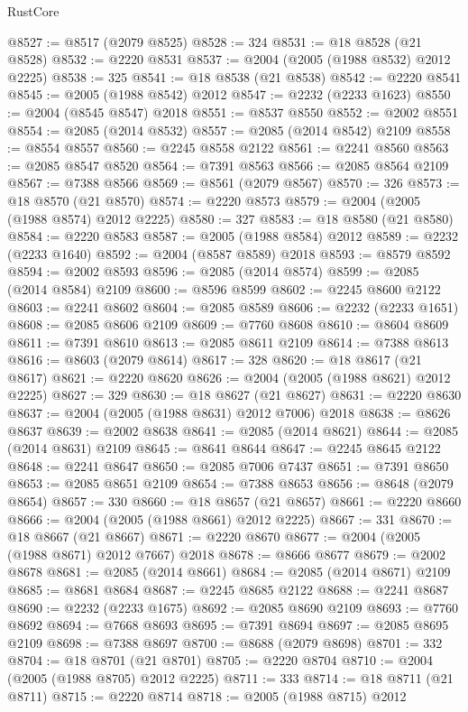 \begin{lexlean}{RustCore}
\begin{coremodule}
@8527 := @8517 (@2079 @8525)
@8528 := 324
@8531 := @18 @8528 (@21 @8528)
@8532 := @2220 @8531
@8537 := @2004 (@2005 (@1988 @8532) @2012 @2225)
@8538 := 325
@8541 := @18 @8538 (@21 @8538)
@8542 := @2220 @8541
@8545 := @2005 (@1988 @8542) @2012
@8547 := @2232 (@2233 @1623)
@8550 := @2004 (@8545 @8547) @2018
@8551 := @8537 @8550
@8552 := @2002 @8551
@8554 := @2085 (@2014 @8532)
@8557 := @2085 (@2014 @8542) @2109
@8558 := @8554 @8557
@8560 := @2245 @8558 @2122
@8561 := @2241 @8560
@8563 := @2085 @8547 @8520
@8564 := @7391 @8563
@8566 := @2085 @8564 @2109
@8567 := @7388 @8566
@8569 := @8561 (@2079 @8567)
@8570 := 326
@8573 := @18 @8570 (@21 @8570)
@8574 := @2220 @8573
@8579 := @2004 (@2005 (@1988 @8574) @2012 @2225)
@8580 := 327
@8583 := @18 @8580 (@21 @8580)
@8584 := @2220 @8583
@8587 := @2005 (@1988 @8584) @2012
@8589 := @2232 (@2233 @1640)
@8592 := @2004 (@8587 @8589) @2018
@8593 := @8579 @8592
@8594 := @2002 @8593
@8596 := @2085 (@2014 @8574)
@8599 := @2085 (@2014 @8584) @2109
@8600 := @8596 @8599
@8602 := @2245 @8600 @2122
@8603 := @2241 @8602
@8604 := @2085 @8589
@8606 := @2232 (@2233 @1651)
@8608 := @2085 @8606 @2109
@8609 := @7760 @8608
@8610 := @8604 @8609
@8611 := @7391 @8610
@8613 := @2085 @8611 @2109
@8614 := @7388 @8613
@8616 := @8603 (@2079 @8614)
@8617 := 328
@8620 := @18 @8617 (@21 @8617)
@8621 := @2220 @8620
@8626 := @2004 (@2005 (@1988 @8621) @2012 @2225)
@8627 := 329
@8630 := @18 @8627 (@21 @8627)
@8631 := @2220 @8630
@8637 := @2004 (@2005 (@1988 @8631) @2012 @7006) @2018
@8638 := @8626 @8637
@8639 := @2002 @8638
@8641 := @2085 (@2014 @8621)
@8644 := @2085 (@2014 @8631) @2109
@8645 := @8641 @8644
@8647 := @2245 @8645 @2122
@8648 := @2241 @8647
@8650 := @2085 @7006 @7437
@8651 := @7391 @8650
@8653 := @2085 @8651 @2109
@8654 := @7388 @8653
@8656 := @8648 (@2079 @8654)
@8657 := 330
@8660 := @18 @8657 (@21 @8657)
@8661 := @2220 @8660
@8666 := @2004 (@2005 (@1988 @8661) @2012 @2225)
@8667 := 331
@8670 := @18 @8667 (@21 @8667)
@8671 := @2220 @8670
@8677 := @2004 (@2005 (@1988 @8671) @2012 @7667) @2018
@8678 := @8666 @8677
@8679 := @2002 @8678
@8681 := @2085 (@2014 @8661)
@8684 := @2085 (@2014 @8671) @2109
@8685 := @8681 @8684
@8687 := @2245 @8685 @2122
@8688 := @2241 @8687
@8690 := @2232 (@2233 @1675)
@8692 := @2085 @8690 @2109
@8693 := @7760 @8692
@8694 := @7668 @8693
@8695 := @7391 @8694
@8697 := @2085 @8695 @2109
@8698 := @7388 @8697
@8700 := @8688 (@2079 @8698)
@8701 := 332
@8704 := @18 @8701 (@21 @8701)
@8705 := @2220 @8704
@8710 := @2004 (@2005 (@1988 @8705) @2012 @2225)
@8711 := 333
@8714 := @18 @8711 (@21 @8711)
@8715 := @2220 @8714
@8718 := @2005 (@1988 @8715) @2012

\end{coremodule}
\end{lexlean}
